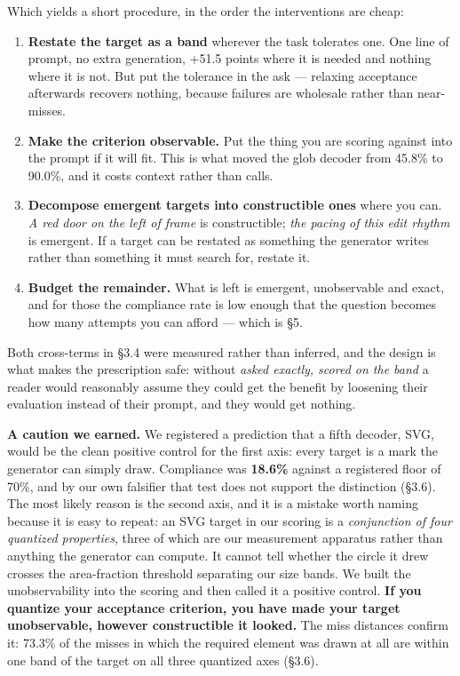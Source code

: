 \documentclass[
  10pt,
]{article}
\providecommand{\tightlist}{%
  \setlength{\itemsep}{0pt}\setlength{\parskip}{0pt}}
\theoremstyle{plain}
\theoremstyle{definition}
\providecommand{\tightlist}{\setlength{\itemsep}{0pt}\setlength{\parskip}{0pt}}
\begin{document}
Which yields a short procedure, in the order the interventions are
cheap:

\begin{enumerate}
\def\labelenumi{\arabic{enumi}.}
\tightlist
\item
  \textbf{Restate the target as a band} wherever the task tolerates one.
  One line of prompt, no extra generation, +51.5 points where it is
  needed and nothing where it is not. But put the tolerance in the ask
  --- relaxing acceptance afterwards recovers nothing, because failures
  are wholesale rather than near-misses.
\item
  \textbf{Make the criterion observable.} Put the thing you are scoring
  against into the prompt if it will fit. This is what moved the glob
  decoder from 45.8\% to 90.0\%, and it costs context rather than calls.
\item
  \textbf{Decompose emergent targets into constructible ones} where you
  can. \emph{A red door on the left of frame} is constructible;
  \emph{the pacing of this edit rhythm} is emergent. If a target can be
  restated as something the generator writes rather than something it
  must search for, restate it.
\item
  \textbf{Budget the remainder.} What is left is emergent, unobservable
  and exact, and for those the compliance rate is low enough that the
  question becomes how many attempts you can afford --- which is §5.
\end{enumerate}

Both cross-terms in §3.4 were measured rather than inferred, and the
design is what makes the prescription safe: without \emph{asked exactly,
scored on the band} a reader would reasonably assume they could get the
benefit by loosening their evaluation instead of their prompt, and they
would get nothing.

\textbf{A caution we earned.} We registered a prediction that a fifth
decoder, SVG, would be the clean positive control for the first axis:
every target is a mark the generator can simply draw. Compliance was
\textbf{18.6\%} against a registered floor of 70\%, and by our own
falsifier that test does not support the distinction (§3.6). The most
likely reason is the second axis, and it is a mistake worth naming
because it is easy to repeat: an SVG target in our scoring is a
\emph{conjunction of four quantized properties}, three of which are our
measurement apparatus rather than anything the generator can compute. It
cannot tell whether the circle it drew crosses the area-fraction
threshold separating our size bands. We built the unobservability into
the scoring and then called it a positive control. \textbf{If you
quantize your acceptance criterion, you have made your target
unobservable, however constructible it looked.} The miss distances
confirm it: 73.3\% of the misses in which the required element was drawn
at all are within one band of the target on all three quantized axes
(§3.6).
\end{document}
